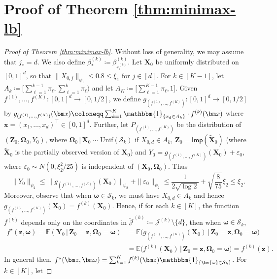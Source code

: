 \documentclass[12pt]{article}
\def\tilde{\widetilde}
\begin{document}
\section{Proof of Theorem \ref{thm:minimax-lb}}
\begin{proof}[Proof of Theorem \ref{thm:minimax-lb}]
    Without loss of generality, we may assume that $j_* = d$. We also define $\beta_*^{(k)} \coloneqq \beta^{(k)}_{r_*^{(k)}}$. Let $\bm X_0$ be uniformly distributed on $[0,1]^d$, so that $\|X_{0,j}\|_{\psi_1} \leq 0.8 \leq \xi_1$ for $j\in[d]$. For $k\in[K-1]$, let $A_k \coloneqq \bigl[\sum_{\ell=1}^{k-1} \pi_\ell, \sum_{\ell=1}^{k} \pi_\ell\bigr)$ and let $A_K \coloneqq \bigl[\sum_{\ell=1}^{K-1} \pi_\ell, 1\bigr]$.
    Given $f^{(1)}, \ldots, f^{(K)} : [0,1]^d \to [0,1/2]$, we define $g_{(f^{(1)},\ldots,f^{(K)})} : [0,1]^d \to [0,1/2]$ by $g_{(f^{(1)},\ldots,f^{(K)})}(\bm x) \coloneqq \sum_{k=1}^K \mathbbm{1}_{\{x_d \in A_k\}} \cdot f^{(k)}(\bm x)$ where $\bm x = (x_1,\ldots,x_d)^\top \in [0,1]^d$. 
    Further, let $P_{(f^{(1)}, \ldots, f^{(K)})}$ be the distribution of $(\bm Z_0,\bm\Omega_0,Y_0)$, where $\bm\Omega_0 \,|\, \bm X_0 \sim \mathrm{Unif}(\mathcal{S}_k)$ if $X_{0,d} \in A_k$, $\bm Z_0 = \mathsf{Imp}(\tilde{\bm X}_0)$ (where $\tilde{\bm{X}}_0$ is the partially observed version of $\bm{X}_0$) and $Y_0 = g_{(f^{(1)},\ldots,f^{(K)})}(\bm X_0) + \varepsilon_0$, where $\varepsilon_0 \sim N(0,\xi_2^2/25)$ is independent of $(\bm X_0, \bm\Omega_0)$.  Thus 
    \[
    \|Y_0\|_{\psi_2} \leq \|g_{(f^{(1)},\ldots,f^{(K)})}(\bm X_0)\|_{\psi_2} + \|\varepsilon_0\|_{\psi_2} \leq \frac{1}{2\sqrt{\log 2}} + \sqrt{\frac{8}{75}}\xi_2 \leq \xi_2.
    \]
    Moreover, observe that when $\bm{\omega} \in \mathcal{S}_k$, we must have $X_{0,d} \in A_k$ and hence $g_{(f^{(1)},\ldots,f^{(K)})}(\bm X_0) = f^{(k)}(\bm{X}_0)$.  Hence, if for each $k\in[K]$, the function $f^{(k)}$ depends only on the coordinates in $\tilde{\mathcal{J}}^{(k)} \coloneqq\mathcal{J}^{(k)}\setminus\{d\}$, then when $\bm{\omega} \in \mathcal{S}_k$,
    \begin{align*}
    f^{\star}(\bm z, \bm\omega) = \mathbb{E}(\bm{Y}_0 \, | \, \bm{Z}_0 = \bm{z},\bm{\Omega}_0 = \bm{\omega}) &= \mathbb{E}\bigl(g_{(f^{(1)},\ldots,f^{(K)})}(\bm X_0) \, | \, \bm{Z}_0 = \bm{z},\bm{\Omega}_0 = \bm{\omega}\bigr) \\
    &= \mathbb{E}\bigl(f^{(k)}(\bm X_0) \, | \, \bm{Z}_0 = \bm{z},\bm{\Omega}_0 = \bm{\omega}\bigr) = f^{(k)}(\bm z).
    \end{align*}
    In general then, $f^{\star}(\bm z, \bm\omega) = \sum_{k=1}^K f^{(k)}(\bm z)\mathbbm{1}_{\{\bm{\omega} \in \mathcal{S}_k\}}$.  For $k \in [K]$, let 

\end{proof}
\end{document}
